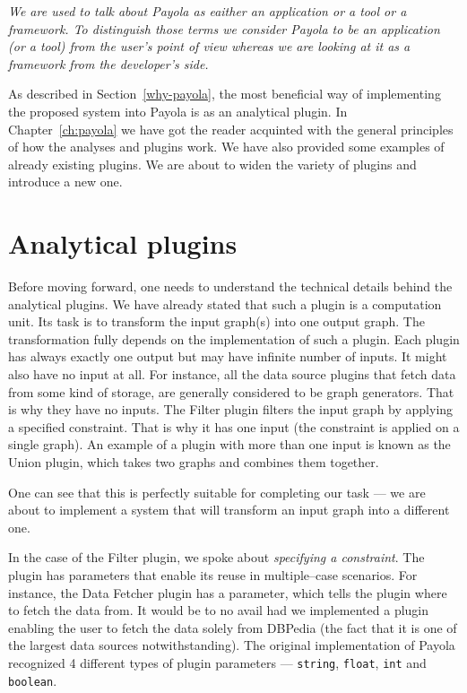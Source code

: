 \emph{We are used to talk about Payola as eaither an application or a tool or a framework. To
distinguish those terms we consider Payola to be an application (or a tool) from the user’s
point of view whereas we are looking at it as a framework from the developer’s side.}

As described in Section~\ref{why-payola}, the most beneficial way of 
implementing the proposed system into Payola is as an analytical plugin. In Chapter~\ref{ch:payola}
we have got the reader acquinted with the 
general principles of how the analyses and plugins work. We have also provided some examples 
of already existing plugins. We are about to widen the variety of plugins and 
introduce a new one.

\section{Analytical plugins}
Before moving forward, one needs to understand the technical 
details behind the analytical plugins. We have already stated that such a plugin is 
a computation unit. Its task is to transform the input graph(s) into one output 
graph. The transformation fully depends on the implementation of such a 
plugin. Each plugin has always exactly one output but may have infinite number of 
inputs. It might also have no input at all. For instance, all the data 
source plugins that fetch data from some kind of storage, are generally considered to be
graph generators. That is why they have no inputs. The Filter 
plugin filters the input graph by applying a specified constraint. That is why it 
has one input (the constraint is applied on a single graph).
An example of a plugin with more than one input is known as the Union 
plugin, which takes two graphs and combines them together.

One can see that this is perfectly suitable for completing our task --- we are about to 
implement a system that will transform an input graph into a different one.

In the case of the Filter plugin, we spoke about \emph{specifying a 
constraint}. The plugin has parameters that enable its reuse in multiple--case scenarios. For instance,
the Data Fetcher plugin has a parameter, which tells 
the plugin where to fetch the data from. It would be to no avail had we implemented a plugin
enabling the user to fetch the data solely from DBPedia (the fact that it is one of the largest data
sources notwithstanding).
The original implementation of Payola recognized 4 different types of plugin 
parameters --- \texttt{string}, \texttt{float}, \texttt{int} and \texttt{boolean}. 

